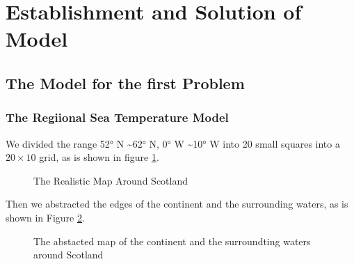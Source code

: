 \documentclass{mcmthesis}
\numberwithin{figure}{section}
\numberwithin{table}{section}
\begin{document}
\section{Establishment and Solution of Model}
\subsection{The Model for the first Problem}
\subsubsection{The Regiional Sea Temperature Model}
We divided the range \ang{52} N \textasciitilde \ang{62} N, \ang{0} W \textasciitilde \ang{10} W into 20 small squares into a $20 \times 10$ grid, as is shown in figure \ref{RealMap}.


\begin{figure}[H]
  \caption{The Realistic Map Around Scotland}\label{RealMap}
\end{figure}

Then we abstracted the edges of the continent and the surrounding waters, as is shown in Figure \ref{AbstractMap}.
\begin{figure}[H]
  \caption{The abstacted map of the continent and the surroundting waters around Scotland}\label{AbstractMap}
\end{figure}
\end{document}
